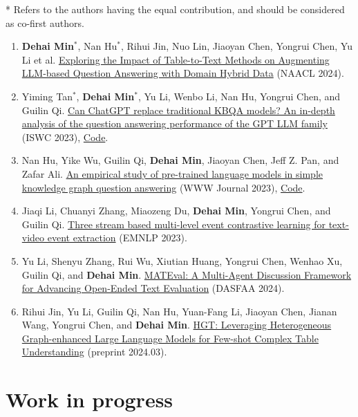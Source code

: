 \documentclass[a4paper,12pt]{article}
\begin{document}
* Refers to the authors having the equal contribution, and should be considered as co-first authors.
\begin{enumerate}

\item \textbf{Dehai Min}$^*$, Nan Hu$^*$, Rihui Jin, Nuo Lin, Jiaoyan Chen, Yongrui Chen, Yu Li et al. \href{https://arxiv.org/abs/2402.12869}{Exploring the Impact of Table-to-Text Methods on Augmenting LLM-based Question Answering with Domain Hybrid Data} (NAACL 2024).

\item Yiming Tan$^*$, \textbf{Dehai Min}$^*$, Yu Li, Wenbo Li, Nan Hu, Yongrui Chen, and Guilin Qi. \href{https://link.springer.com/chapter/10.1007/978-3-031-47240-4_19}{Can ChatGPT replace traditional KBQA models? An in-depth analysis of the question answering performance of the GPT LLM family} (ISWC 2023), \href{https://github.com/tan92hl/Complex-Question-Answering-Evaluation-of-GPT-family}{Code}.

\item Nan Hu, Yike Wu, Guilin Qi, \textbf{Dehai Min}, Jiaoyan Chen, Jeff Z. Pan, and Zafar Ali. \href{https://link.springer.com/article/10.1007/s11280-023-01166-y}{An empirical study of pre-trained language models in simple knowledge graph question answering} (WWW Journal 2023), \href{https://github.com/HuuuNan/PLMs-in-Practical-KBQA}{Code}.

\item Jiaqi Li, Chuanyi Zhang, Miaozeng Du, \textbf{Dehai Min}, Yongrui Chen, and Guilin Qi. \href{https://aclanthology.org/2023.emnlp-main.103/}{Three stream based multi-level event contrastive learning for text-video event extraction} (EMNLP 2023).

\item Yu Li, Shenyu Zhang, Rui Wu, Xiutian Huang, Yongrui Chen, Wenhao Xu, Guilin Qi, and \textbf{Dehai Min}. \href{https://arxiv.org/abs/2403.19305}{MATEval: A Multi-Agent Discussion Framework for Advancing Open-Ended Text Evaluation} (DASFAA 2024).

\item Rihui Jin, Yu Li, Guilin Qi, Nan Hu, Yuan-Fang Li, Jiaoyan Chen, Jianan Wang, Yongrui Chen, and \textbf{Dehai Min}. \href{https://arxiv.org/abs/2403.19723}{HGT: Leveraging Heterogeneous Graph-enhanced Large Language Models for Few-shot Complex Table Understanding} (preprint 2024.03).
\end{enumerate}

\section{Work in progress}
\end{document}
